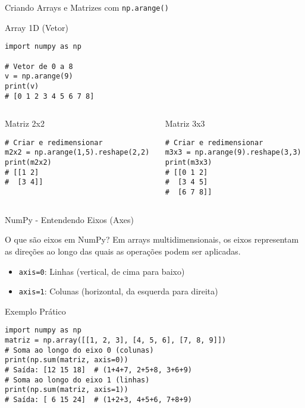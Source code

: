 \begin{frame}[fragile]{Criando Arrays e Matrizes com \texttt{np.arange()}}

\begin{block}{Array 1D (Vetor)}
\begin{verbatim}
import numpy as np

# Vetor de 0 a 8
v = np.arange(9)
print(v)
# [0 1 2 3 4 5 6 7 8]
\end{verbatim}
\end{block}

\begin{columns}[T]
    \begin{column}{0.5\textwidth}
        \begin{block}{Matriz 2x2}
\begin{verbatim}
# Criar e redimensionar
m2x2 = np.arange(1,5).reshape(2,2)
print(m2x2)
# [[1 2]
#  [3 4]]
\end{verbatim}
        \end{block}
    \end{column}
    
    \begin{column}{0.5\textwidth}
        \begin{block}{Matriz 3x3}
\begin{verbatim}
# Criar e redimensionar
m3x3 = np.arange(9).reshape(3,3)
print(m3x3)
# [[0 1 2]
#  [3 4 5]
#  [6 7 8]]
\end{verbatim}
        \end{block}
    \end{column}
\end{columns}


\end{frame}

\begin{frame}[fragile]{NumPy - Entendendo Eixos (Axes)}

\begin{block}{O que são eixos em NumPy?}
Em arrays multidimensionais, os eixos representam as direções ao longo das quais as operações podem ser aplicadas.
\begin{itemize}
    \item \texttt{axis=0}: Linhas (vertical, de cima para baixo)
    \item \texttt{axis=1}: Colunas (horizontal, da esquerda para direita)
\end{itemize}
\end{block}

\begin{exampleblock}{Exemplo Prático}
\begin{verbatim}
import numpy as np
matriz = np.array([[1, 2, 3], [4, 5, 6], [7, 8, 9]])
# Soma ao longo do eixo 0 (colunas)
print(np.sum(matriz, axis=0))
# Saída: [12 15 18]  # (1+4+7, 2+5+8, 3+6+9)
# Soma ao longo do eixo 1 (linhas)
print(np.sum(matriz, axis=1)) 
# Saída: [ 6 15 24]  # (1+2+3, 4+5+6, 7+8+9)
\end{verbatim}
\end{exampleblock}


\end{frame}

